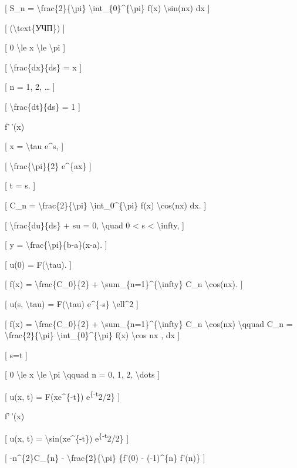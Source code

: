 \documentclass[
]{article}
\begin{document}
{[} S\_n = \textbackslash frac\{2\}\{\textbackslash pi\}
\textbackslash int\_\{0\}\^{}\{\textbackslash pi\} f(x)
\textbackslash sin(nx) dx {]}

{[} (\textbackslash text\{УЧП\}) {]}

{[} 0 \textbackslash le x \textbackslash le \textbackslash pi {]}

{[} \textbackslash frac\{dx\}\{ds\} = x {]}

{[} n = 1, 2, \ldots{} {]}

{[} \textbackslash frac\{dt\}\{ds\} = 1 {]}

f'\,'(x)

{[} x = \textbackslash tau e\^{}s, {]}

{[} \textbackslash frac\{\textbackslash pi\}\{2\} e\^{}\{ax\} {]}

{[} t = s. {]}

{[} C\_n = \textbackslash frac\{2\}\{\textbackslash pi\}
\textbackslash int\_0\^{}\{\textbackslash pi\} f(x)
\textbackslash cos(nx) dx. {]}

{[} \textbackslash frac\{du\}\{ds\} + su = 0, \textbackslash quad 0
\textless{} s \textless{} \textbackslash infty, {]}

{[} y = \textbackslash frac\{\textbackslash pi\}\{b-a\}(x-a). {]}

{[} u(0) = F(\textbackslash tau). {]}

{[} f(x) = \textbackslash frac\{C\_0\}\{2\} +
\textbackslash sum\_\{n=1\}\^{}\{\textbackslash infty\} C\_n
\textbackslash cos(nx). {]}

{[} u(s, \textbackslash tau) = F(\textbackslash tau) e\^{}\{-s\}
\textbackslash ell\^{}2 {]}

{[} f(x) = \textbackslash frac\{C\_0\}\{2\} +
\textbackslash sum\_\{n=1\}\^{}\{\textbackslash infty\} C\_n
\textbackslash cos(nx) \textbackslash qquad C\_n =
\textbackslash frac\{2\}\{\textbackslash pi\}
\textbackslash int\_\{0\}\^{}\{\textbackslash pi\} f(x)
\textbackslash cos nx , dx {]}

{[} s=t {]}

{[} 0 \textbackslash le x \textbackslash le \textbackslash pi
\textbackslash qquad n = 0, 1, 2, \textbackslash dots {]}

{[} u(x, t) = F(xe\^{}\{-t\}) e\textsuperscript{\{-t}2/2\} {]}

f'\,'(x)

{[} u(x, t) = \textbackslash sin(xe\^{}\{-t\})
e\textsuperscript{\{-t}2/2\} {]}

{[} -n\^{}\{2\}C\_\{n\} - \textbackslash frac\{2\}\{\textbackslash pi\}
\{f'(0) - (-1)\^{}\{n\} f'(n)\} {]}
\end{document}
